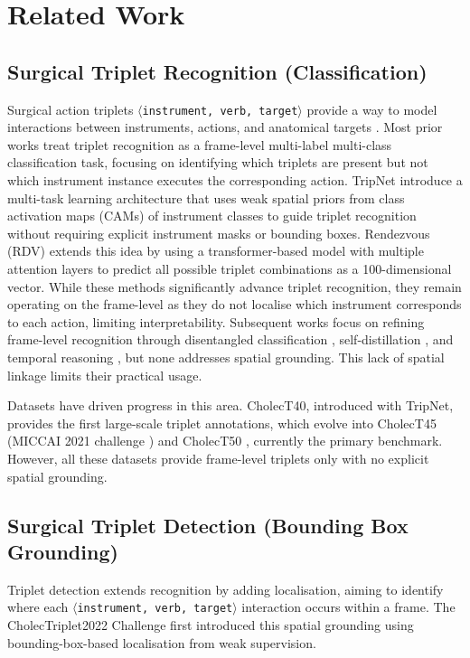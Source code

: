 \documentclass[pdflatex,sn-mathphys-num]{sn-jnl}%
\newcommand{\ivttriplet}{\texttt{$\langle$instrument, verb, target$\rangle$}\xspace}
\theoremstyle{thmstyleone}%
\theoremstyle{thmstyletwo}%
\theoremstyle{thmstylethree}%
\begin{document}
\section{Related Work}\label{sec::related_works}
\subsection{Surgical Triplet Recognition (Classification)} 
Surgical action triplets \ivttriplet provide a  way to model interactions between instruments, actions, and anatomical targets \cite{katic2014knowledge}. Most prior works treat triplet recognition as a frame-level multi-label multi-class classification task, focusing on identifying which triplets are present but not which instrument instance executes the corresponding action. TripNet \cite{nwoye2020recognition} introduce a multi-task learning architecture that uses weak spatial priors from class activation maps (CAMs) of instrument classes to guide triplet recognition without requiring explicit instrument masks or bounding boxes. Rendezvous (RDV) \cite{nwoye2022rendezvous} extends this idea by using a transformer-based model with multiple attention layers to predict all possible triplet combinations as a 100-dimensional vector. While these methods significantly advance triplet recognition, they remain operating on the frame-level as they do not localise which instrument corresponds to each action, limiting interpretability. 
Subsequent works focus on refining frame-level recognition through disentangled classification \cite{chen2023surgical_tfn}, self-distillation \cite{yamlahi2023self}, and temporal reasoning \cite{sharma2023rendezvous}, but none addresses spatial grounding. 
This lack of spatial linkage limits their practical usage.

Datasets have driven progress in this area. CholecT40, introduced with TripNet, provides the first large-scale triplet annotations, which evolve into CholecT45 (MICCAI 2021 challenge \cite{nwoye2023cholectriplet2021}) and CholecT50 \cite{nwoye2022rendezvous}, currently the primary benchmark. However, all these datasets provide frame-level triplets only with no explicit spatial grounding.

\subsection{Surgical Triplet Detection (Bounding Box Grounding)}
Triplet detection extends recognition by adding localisation, aiming to identify where each \ivttriplet interaction occurs within a frame. The CholecTriplet2022 Challenge \cite{nwoye2023cholectriplet2022_tfn} first introduced this spatial grounding using bounding-box-based localisation from weak supervision.
\end{document}
